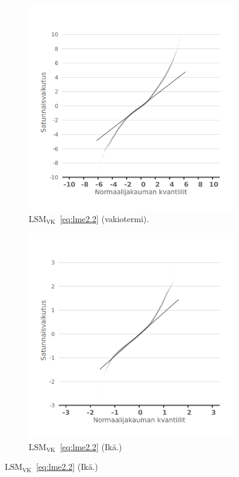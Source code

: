 \documentclass[finnish]{docopts}
\begin{document}
\begin{figure}[H]
\begin{subfigure}[b]{0.4\textwidth}
  \label{fig:lme_taysi_ika_qq}
\end{subfigure}
\begin{subfigure}[b]{0.4\textwidth}
\centering
  \includegraphics[width=.8\linewidth]{kuvaajat/lme3_vc_qq_ranef_int.png}
  \caption{$\text{LSM}_{\text{VK}}$~\ref{eq:lme2.2} (vakiotermi).}
  \label{fig:lme_vk_krit_int_qq}
\end{subfigure}%
\begin{subfigure}[b]{0.4\textwidth}
\centering
  \includegraphics[width=.8\linewidth]{kuvaajat/lme3_vc_qq_ranef_ika.png}
  \caption{$\text{LSM}_{\text{VK}}$~\ref{eq:lme2.2} (Ikä.)}

\end{subfigure}
\end{figure}
\end{document}
